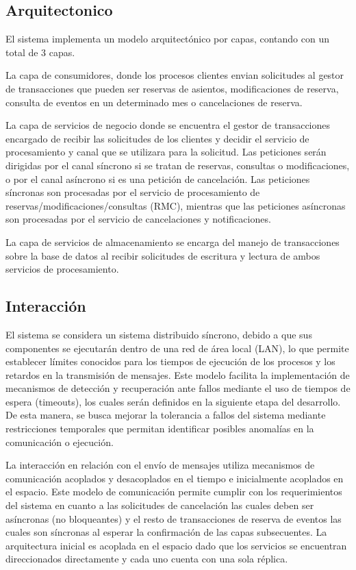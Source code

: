 \documentclass[conference]{IEEEtran}
\begin{document}
\subsection{Arquitectonico}
El sistema implementa un modelo arquitectónico por capas, contando con un total de 3 capas. 

La capa de consumidores, donde los procesos clientes envian solicitudes al gestor de transacciones que pueden ser
reservas de asientos, modificaciones de reserva, consulta de eventos en un determinado mes o cancelaciones de reserva.

La capa de servicios de negocio donde se encuentra el gestor de transacciones encargado de recibir las solicitudes 
de los clientes y decidir el servicio de procesamiento y canal que se utilizara para la solicitud.
Las peticiones serán dirigidas por el canal síncrono si se tratan de reservas, consultas o modificaciones, o por el canal 
asíncrono si es una petición de cancelación. Las peticiones síncronas son procesadas por el servicio de procesamiento
de reservas/modificaciones/consultas  (RMC), mientras que las peticiones asíncronas son procesadas por el servicio de 
cancelaciones y notificaciones.

La capa de servicios de almacenamiento se encarga del manejo de transacciones sobre la base de datos al recibir 
solicitudes de escritura y lectura de ambos servicios de procesamiento.

\subsection{Interacción}

El sistema se considera un sistema distribuido síncrono, debido a que sus componentes se ejecutarán dentro de una red de área local (LAN), 
lo que permite establecer límites conocidos para los tiempos de ejecución de los procesos y los retardos en la transmisión de mensajes. 
Este modelo facilita la implementación de mecanismos de detección y recuperación ante fallos mediante el uso de tiempos de espera 
(timeouts), los cuales serán definidos en la siguiente etapa del desarrollo. 
De esta manera, se busca mejorar la tolerancia a fallos del sistema mediante restricciones temporales que permitan identificar 
posibles anomalías en la comunicación o ejecución.

La interacción en relación con el envío de mensajes utiliza mecanismos de comunicación acoplados y desacoplados en el
tiempo e inicialmente acoplados en el espacio. Este modelo de comunicación permite cumplir con los requerimientos del
sistema en cuanto a las solicitudes de cancelación las cuales deben ser asíncronas (no bloqueantes) y el
resto de transacciones de reserva de eventos las cuales son síncronas al esperar la confirmación de las capas subsecuentes.
La arquitectura inicial es acoplada en el espacio dado que los servicios se encuentran direccionados directamente y cada uno
cuenta con una sola réplica. 
\end{document}
